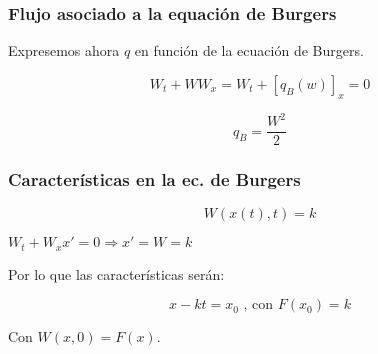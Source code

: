 		\subsubsection{Flujo asociado a la equación de Burgers}

			Expresemos ahora $q$ en función de la ecuación de Burgers.

			$$W_t + WW_x = W_t + [q_B(w)]_x = 0$$

			$$q_{B} = \frac{W^2}{2}$$


		\subsubsection{Características en la ec. de Burgers}

			$$W(x(t),t) = k$$

			$W_t + W_x x' = 0 \Rightarrow x' = W = k$

			Por lo que las características serán:

			$$x-kt = x_0 \text{ , con }F(x_0) = k$$

			\begin{figure}[hbtp]
				\centering
				\caption{}
				\label{fig:CaracteristicasBurger}
			\end{figure}

			Con $W(x,0) = F(x)$.

